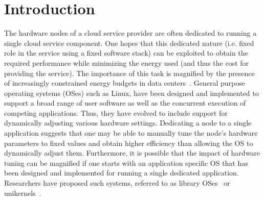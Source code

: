\section{Introduction}


The hardware nodes of a cloud service provider are often dedicated to running a single cloud service component.
One hopes that this dedicated nature (i.e. fixed role in the service using a fixed software stack) can be exploited to obtain the required performance while minimizing the energy used (and thus the cost for providing the service). The importance of this task is magnified by the presence of increasingly constrained energy budgets in data centers~\cite{SmoothOperator, Dynamo}. General purpose operating systems (OSes) such as Linux, have been designed and implemented to support a broad range of user software as well as the concurrent execution of competing applications. Thus, they have evolved to include support for dynamically adjusting various hardware settings. Dedicating a node to a single application suggests that one may be able to manually tune the node's hardware parameters to fixed values and obtain higher efficiency than allowing the OS to dynamically adjust them.  Furthermore, it is possible that the impact of hardware tuning can be magnified if one starts with an application specific OS that has been designed and implemented for running a single dedicated application.  Researchers have proposed  such systems, referred to as library OSes~\cite{ebbrt,ix,arrakis, exokernel} or unikernels~\cite{rumpkernel, unikernels, aliraza}.  

